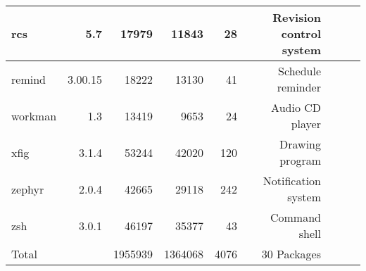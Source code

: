 \begin{tabular}{|l|r|r|r|r|r|r|r|l|}
rcs & 5.7 & 17979 & 11843 & 28 & Revision control system \\\hline
remind & 3.00.15 & 18222 & 13130 & 41 & Schedule reminder \\\hline
workman & 1.3 & 13419 & 9653 & 24 & Audio CD player \\\hline
xfig & 3.1.4 & 53244 & 42020 & 120 & Drawing program \\\hline
zephyr & 2.0.4 & 42665 & 29118 & 242 & Notification system \\\hline
zsh & 3.0.1 & 46197 & 35377 & 43 & Command shell \\\hline
\hline
Total & & 1955939 & 1364068 & 4076 & 30 Packages\\\hline
\end{tabular}

